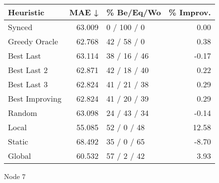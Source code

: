 \begin{tabular}{lrlr}
\toprule
\textbf{Heuristic} & \textbf{MAE ↓} & \textbf{\% Be/Eq/Wo} & \textbf{\% Improv.} \\
\midrule
            Synced &         63.009 &          0 / 100 / 0 &                0.00 \\
     Greedy Oracle &         62.768 &          42 / 58 / 0 &                0.38 \\
         Best Last &         63.114 &         38 / 16 / 46 &               -0.17 \\
       Best Last 2 &         62.871 &         42 / 18 / 40 &                0.22 \\
       Best Last 3 &         62.824 &         41 / 21 / 38 &                0.29 \\
    Best Improving &         62.824 &         41 / 20 / 39 &                0.29 \\
            Random &         63.098 &         24 / 43 / 34 &               -0.14 \\
             Local &         55.085 &          52 / 0 / 48 &               12.58 \\
            Static &         68.492 &          35 / 0 / 65 &               -8.70 \\
            Global &         60.532 &          57 / 2 / 42 &                3.93 \\
\bottomrule
\end{tabular}
\caption{Node 7}
\label{tab:non_lr01_le1_bs2_7}
